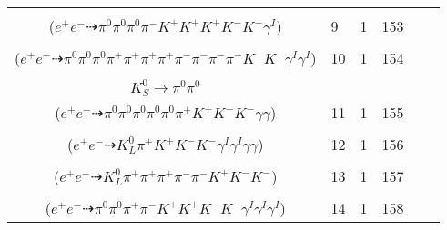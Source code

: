 \documentclass[landscape]{article}
\newcounter{rownumbers}
\newcommand\rn{\stepcounter{rownumbers}\arabic{rownumbers}}
\newcommand{\EOL}{\\} %
\newcommand{\topoTags}[1]{#1} %
\begin{document}
\begin{longtable}{clcccc}
\rn & \makecell[l]{ $ 
e^{+} e^{-} \rightarrow \bar{K}^{0} K^{*} K^{+} K^{*-} \phi \gamma^{I} ,
\bar{K}^{0} \rightarrow K_{S}^{0} ,
K^{*} \rightarrow \pi^{-} K^{+} ,
K^{*-} \rightarrow \pi^{0} K^{-} ,
\phi \rightarrow K^{+} K^{-} ,
K_{S}^{0} \rightarrow \pi^{0} \pi^{0} 
$ \\ ($
e^{+} e^{-} \dashrightarrow \pi^{0} \pi^{0} \pi^{0} \pi^{-} K^{+} K^{+} K^{+} K^{-} K^{-} \gamma^{I} 
$) } & \topoTags{9 & }1 & 153 \EOL

\rn & \makecell[l]{ $ 
e^{+} e^{-} \rightarrow \pi^{0} \pi^{0} \pi^{0} \rho^{0} \pi^{+} \pi^{+} \pi^{+} \pi^{-} \pi^{-} \pi^{-} K^{+} K^{-} \gamma^{I} \gamma^{I} ,
\rho^{0} \rightarrow \pi^{+} \pi^{-} 
$ \\ ($
e^{+} e^{-} \dashrightarrow \pi^{0} \pi^{0} \pi^{0} \pi^{+} \pi^{+} \pi^{+} \pi^{+} \pi^{-} \pi^{-} \pi^{-} \pi^{-} K^{+} K^{-} \gamma^{I} \gamma^{I} 
$) } & \topoTags{10 & }1 & 154 \EOL

\rn & \makecell[l]{ $ 
e^{+} e^{-} \rightarrow \rho^{+} \eta K^{0} K^{-} K^{*+} K^{*-} ,
\rho^{+} \rightarrow \pi^{0} \pi^{+} ,
\eta \rightarrow \gamma \gamma ,
K^{0} \rightarrow K_{S}^{0} ,
K^{*+} \rightarrow \pi^{0} K^{+} ,
K^{*-} \rightarrow \pi^{0} K^{-} ,
$ \\ $
K_{S}^{0} \rightarrow \pi^{0} \pi^{0} 
$ \\ ($
e^{+} e^{-} \dashrightarrow \pi^{0} \pi^{0} \pi^{0} \pi^{0} \pi^{0} \pi^{+} K^{+} K^{-} K^{-} \gamma \gamma 
$) } & \topoTags{11 & }1 & 155 \EOL

\rn & \makecell[l]{ $ 
e^{+} e^{-} \rightarrow \eta K^{0} \bar{K}^{*} \phi \gamma^{I} \gamma^{I} ,
\eta \rightarrow \gamma \gamma ,
K^{0} \rightarrow K_{L}^{0} ,
\bar{K}^{*} \rightarrow \pi^{+} K^{-} ,
\phi \rightarrow K^{+} K^{-} 
$ \\ ($
e^{+} e^{-} \dashrightarrow K_{L}^{0} \pi^{+} K^{+} K^{-} K^{-} \gamma^{I} \gamma^{I} \gamma \gamma 
$) } & \topoTags{12 & }1 & 156 \EOL

\rn & \makecell[l]{ $ 
e^{+} e^{-} \rightarrow \rho^{0} \pi^{+} \pi^{+} \pi^{-} K^{0} K^{+} K^{-} K^{-} ,
\rho^{0} \rightarrow \pi^{+} \pi^{-} ,
K^{0} \rightarrow K_{L}^{0} 
$ \\ ($
e^{+} e^{-} \dashrightarrow K_{L}^{0} \pi^{+} \pi^{+} \pi^{+} \pi^{-} \pi^{-} K^{+} K^{-} K^{-} 
$) } & \topoTags{13 & }1 & 157 \EOL

\rn & \makecell[l]{ $ 
e^{+} e^{-} \rightarrow \pi^{+} \pi^{-} K^{-} K^{-} K^{*+} K^{*+} \gamma^{I} \gamma^{I} \gamma^{I} ,
K^{*+} \rightarrow \pi^{0} K^{+} ,
K^{*+} \rightarrow \pi^{0} K^{+} 
$ \\ ($
e^{+} e^{-} \dashrightarrow \pi^{0} \pi^{0} \pi^{+} \pi^{-} K^{+} K^{+} K^{-} K^{-} \gamma^{I} \gamma^{I} \gamma^{I} 
$) } & \topoTags{14 & }1 & 158 \EOL


\end{longtable}
\end{document}
